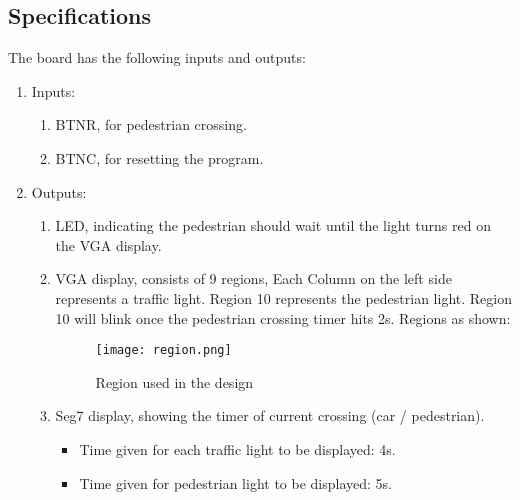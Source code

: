 \documentclass[a4paper,final]{scrartcl}
\numberwithin{equation}{section}		%
\numberwithin{figure}{section}			%
\numberwithin{table}{section}				%
\begin{document}
\subsection{Specifications}
The board has the following inputs and outputs:
\begin{enumerate}
	\item Inputs:
		\begin{enumerate}
			\item BTNR, for pedestrian crossing.
			\item BTNC, for resetting the program.
		\end{enumerate}
	\item Outputs:
		\begin{enumerate}
			\item LED, indicating the pedestrian should wait until the light turns red on the VGA display.
			\item VGA display, consists of 9 regions, Each Column on the left side represents a traffic light. Region 10 represents the pedestrian light. Region 10 will blink once the pedestrian crossing timer hits 2s.
			Regions as shown:

			\begin{figure}[H]
				\centering
				\texttt{[image: region.png]}
				\caption{Region used in the design}
				\label{Region}
			\end{figure}				

			\item Seg7 display, showing the timer of current crossing (car / pedestrian).  
			\begin{itemize}
				\item  Time given for each traffic light to be displayed: 4s.
				\item Time given for pedestrian light to be displayed: 5s. 
			\end{itemize}
		\end{enumerate}
\end{enumerate}
	
\end{document}
